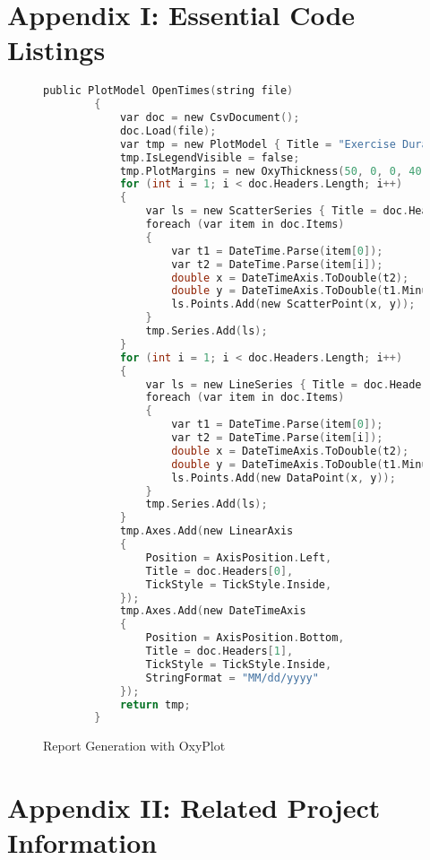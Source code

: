 \documentclass[onecolumn, draftclsnofoot,10pt, compsoc]{IEEEtran}
\begin{document}
\section{Appendix I: Essential Code Listings}
\begin{figure}[H]
\begin{lstlisting}[language=C, style=customc]
 public PlotModel OpenTimes(string file)
        {
            var doc = new CsvDocument();
            doc.Load(file);
            var tmp = new PlotModel { Title = "Exercise Duration Over Time" };
            tmp.IsLegendVisible = false;
            tmp.PlotMargins = new OxyThickness(50, 0, 0, 40);
            for (int i = 1; i < doc.Headers.Length; i++)
            {
                var ls = new ScatterSeries { Title = doc.Headers[i] };
                foreach (var item in doc.Items)
                {
                    var t1 = DateTime.Parse(item[0]);
                    var t2 = DateTime.Parse(item[i]);
                    double x = DateTimeAxis.ToDouble(t2);
                    double y = DateTimeAxis.ToDouble(t1.Minute);
                    ls.Points.Add(new ScatterPoint(x, y));
                }
                tmp.Series.Add(ls);
            }
            for (int i = 1; i < doc.Headers.Length; i++)
            {
                var ls = new LineSeries { Title = doc.Headers[i] };
                foreach (var item in doc.Items)
                {
                    var t1 = DateTime.Parse(item[0]);
                    var t2 = DateTime.Parse(item[i]);
                    double x = DateTimeAxis.ToDouble(t2);
                    double y = DateTimeAxis.ToDouble(t1.Minute);
                    ls.Points.Add(new DataPoint(x, y));
                }
                tmp.Series.Add(ls);
            }
            tmp.Axes.Add(new LinearAxis
            {
                Position = AxisPosition.Left,
                Title = doc.Headers[0],
                TickStyle = TickStyle.Inside,
            });
            tmp.Axes.Add(new DateTimeAxis
            {
                Position = AxisPosition.Bottom,
                Title = doc.Headers[1],
                TickStyle = TickStyle.Inside,
                StringFormat = "MM/dd/yyyy"
            });
            return tmp;
        }
\end{lstlisting}
\caption{Report Generation with OxyPlot}
\end{figure}

\section{Appendix II: Related Project Information}




\end{document}

